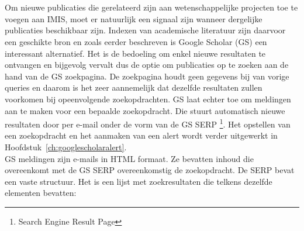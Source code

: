 
\chapter{}%
\label{ch:methodologie}

Om nieuwe publicaties die gerelateerd zijn aan wetenschappelijke projecten toe te voegen aan IMIS, moet er natuurlijk een signaal zijn wanneer dergelijke publicaties beschikbaar zijn. Indexen van academische literatuur zijn daarvoor een geschikte bron en zoals eerder beschreven is Google Scholar (GS) een interessant alternatief. Het is de bedoeling om enkel nieuwe resultaten te ontvangen en bijgevolg vervalt dus de optie om publicaties op te zoeken aan de hand van de GS zoekpagina. De zoekpagina houdt geen gegevens bij van vorige queries en daarom is het zeer aannemelijk dat dezelfde resultaten zullen voorkomen bij opeenvolgende zoekopdrachten. GS laat echter toe om meldingen aan te maken voor een bepaalde zoekopdracht. Die stuurt automatisch nieuwe resultaten door per e-mail onder de vorm van de GS SERP \footnote{Search Engine Result Page}. Het opstellen van een zoekopdracht en het aanmaken van een alert wordt verder uitgewerkt in Hoofdstuk~\ref{ch:googlescholaralert}.\\
GS meldingen zijn e-mails in HTML formaat. Ze bevatten inhoud die overeenkomt met de GS SERP overeenkomstig de zoekopdracht. De SERP bevat een vaste structuur. Het is een lijst met zoekresultaten die telkens dezelfde elementen bevatten:
